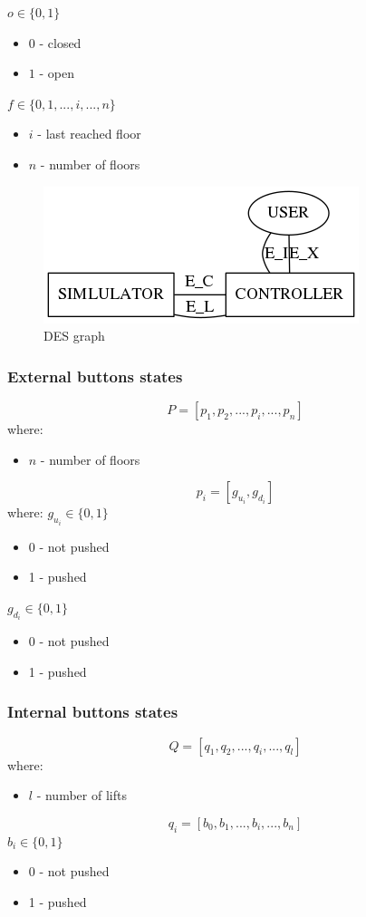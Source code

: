 \documentclass[12pt]{article}
\begin{document}
\(o \in \{0,1\}\)
\begin{itemize}
  \item \(0\) - closed
  \item \(1\) - open
\end{itemize}

\(f \in \{0,1,...,i,...,n\}\)
\begin{itemize}
  \item \(i\) - last reached floor
  \item \(n\) - number of floors
\end{itemize}

\begin{figure}
  \centering
  \includegraphics{img/simulator_controller.png}
  \caption{DES graph}
\end{figure}

\subsubsection{External buttons states}

\[ P = [p_1, p_2, ..., p_i, ..., p_n] \]
where:
\begin{itemize}
  \item \(n\) - number of floors
\end{itemize}

\[ p_i = [g_{u_i}, g_{d_i}] \]
where:
\(g_{u_i} \in \{0,1\}\)
\begin{itemize}
  \item 0 - not pushed
  \item 1 - pushed
\end{itemize}
\(g_{d_i} \in \{0,1\}\)
\begin{itemize}
  \item 0 - not pushed
  \item 1 - pushed
\end{itemize}


\subsubsection{Internal buttons states}
\[ Q = [q_1, q_2, ..., q_i, ..., q_l] \]
where:
\begin{itemize}
  \item \(l\) - number of lifts
\end{itemize}
\[q_i = [b_0, b_1, ..., b_i, ..., b_n] \]
\(b_i \in \{0,1\} \)
\begin{itemize}
  \item 0 - not pushed
  \item 1 - pushed
\end{itemize}
\end{document}
